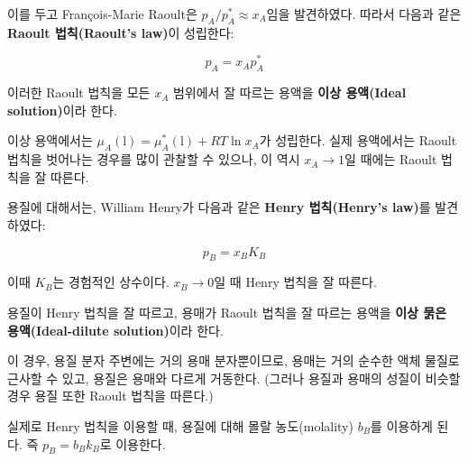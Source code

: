         이를 두고 François-Marie Raoult은 $p_A/p_A^\ast \approx x_A$임을 발견하였다. 따라서 다음과 같은 \textbf{Raoult 법칙(Raoult's law)}이 성립한다:
        \begin{law}[Raoult 법칙]
        \begin{equation*}
            p_A = x_A p_A^\ast
        \end{equation*}
        \end{law}
        \begin{defn}[이상 용액]
        이러한 Raoult 법칙을 모든 $x_A$ 범위에서 잘 따르는 용액을 \textbf{이상 용액(Ideal solution)}이라 한다.
        \end{defn}
        \par 이상 용액에서는 $\mu_A\left(\mathrm{l}\right) = \mu_A^\ast \left(\mathrm{l}\right) + RT \ln{x_A}$가 성립한다. 
        실제 용액에서는 Raoult 법칙을 벗어나는 경우를 많이 관찰할 수 있으나, 이 역시 $x_A \rightarrow 1$일 때에는 Raoult 법칙을 잘 따른다.
        \par 용질에 대해서는, William Henry가 다음과 같은 \textbf{Henry 법칙(Henry's law)}를 발견하였다:
        \begin{law}[Henry 법칙]
        \begin{equation*}
            p_B = x_B K_B
        \end{equation*}
        \end{law}
        이때 $K_B$는 경험적인 상수이다. $x_B \rightarrow 0$일 때 Henry 법칙을 잘 따른다.
        \begin{defn}[이상 묽은 용액]
        \par 용질이 Henry 법칙을 잘 따르고, 용매가 Raoult 법칙을 잘 따르는 용액을 \textbf{이상 묽은 용액(Ideal-dilute solution)}이라 한다.
        \end{defn}
        이 경우, 용질 분자 주변에는 거의 용매 분자뿐이므로, 용매는 거의 순수한 액체 물질로 근사할 수 있고, 용질은 용매와 다르게 거동한다. 
        (그러나 용질과 용매의 성질이 비슷할 경우 용질 또한 Raoult 법칙을 따른다.)
        \par 실제로 Henry 법칙을 이용할 때, 용질에 대해 몰랄 농도(molality) $b_B$를 이용하게 된다. 즉 $p_B = b_B k_B$로 이용한다.
